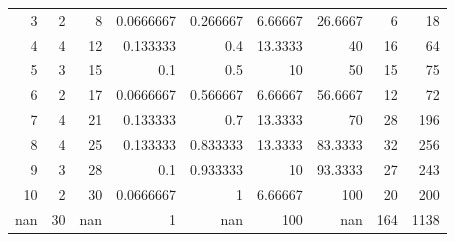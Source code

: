 \documentclass[spanish, 11pt]{exam}
\begin{document}
\begin{questions}
\begin{parts}
\begin{solution}
\begin{tabular}{rrrrrrrrr}
       3 &       2 &       8 & 0.0666667 &   0.266667  &   6.66667 &  26.6667  &          6 &           18 \\
       4 &       4 &      12 & 0.133333  &   0.4       &  13.3333  &  40       &         16 &           64 \\
       5 &       3 &      15 & 0.1       &   0.5       &  10       &  50       &         15 &           75 \\
       6 &       2 &      17 & 0.0666667 &   0.566667  &   6.66667 &  56.6667  &         12 &           72 \\
       7 &       4 &      21 & 0.133333  &   0.7       &  13.3333  &  70       &         28 &          196 \\
       8 &       4 &      25 & 0.133333  &   0.833333  &  13.3333  &  83.3333  &         32 &          256 \\
       9 &       3 &      28 & 0.1       &   0.933333  &  10       &  93.3333  &         27 &          243 \\
      10 &       2 &      30 & 0.0666667 &   1         &   6.66667 & 100       &         20 &          200 \\
     nan &      30 &     nan & 1         & nan         & 100       & nan       &        164 &         1138 \\
\hline

\end{tabular}
\end{solution}
\end{parts}
\end{questions}
\end{document}
